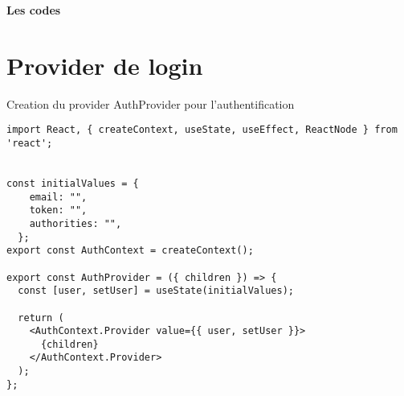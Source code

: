 \documentclass[10pt,a4paper]{article}
\begin{document}
\textbf{Les codes
}
\section{Provider de login}
Creation du provider AuthProvider pour l'authentification
\begin{verbatim}
import React, { createContext, useState, useEffect, ReactNode } from 'react';


const initialValues = {
    email: "",
    token: "",
    authorities: "",
  };
export const AuthContext = createContext();

export const AuthProvider = ({ children }) => {
  const [user, setUser] = useState(initialValues);

  return (
    <AuthContext.Provider value={{ user, setUser }}>
      {children}
    </AuthContext.Provider>
  );
};

\end{verbatim}
\end{document}
